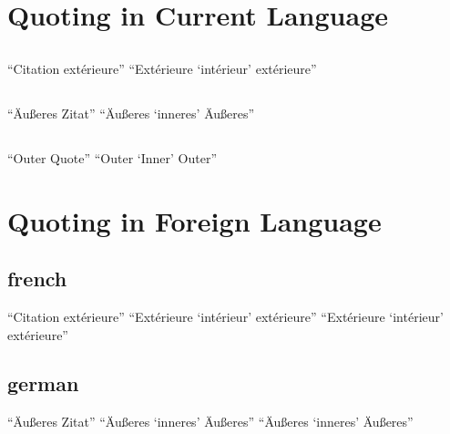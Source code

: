 \documentclass{article}
\begin{document}
\section{Quoting in Current Language}

\subsection{\languagename}
\enquote{Citation extérieure}
\enquote{Extérieure \enquote{intérieur} extérieure}

\subsection{\languagename}
\enquote{Äußeres Zitat}
\enquote{Äußeres \enquote{inneres} Äußeres}

\subsection{\languagename}
\enquote{Outer Quote}
\enquote{Outer \enquote{Inner} Outer}


\section{Quoting in Foreign Language}

\subsection{french}
\foreignquote{french}{Citation extérieure}
\foreignquote{french}{Extérieure \foreignquote{french}{intérieur} extérieure}
\foreignquote{french}{Extérieure \foreignquote*{french}{intérieur} extérieure}


\subsection{german}
\foreignquote{german}{Äußeres Zitat}
\foreignquote{german}{Äußeres \foreignquote{german}{inneres} Äußeres}
\foreignquote{german}{Äußeres \foreignquote*{german}{inneres} Äußeres}
\end{document}
